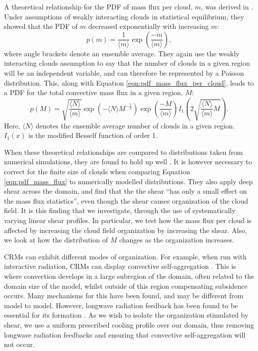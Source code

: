 \documentclass[11pt,a4paper]{article}
\newcommand\todo[1]{\textbf{TODO: #1}}
\begin{document}
A theoretical relationship for the PDF of mass flux per cloud, $m$, was derived in \cite{CC2006I}. Under assumptions of weakly interacting clouds in statistical equilibrium, they showed that the PDF of $m$ decreased exponentially with increasing $m$:
\begin{equation}
    p(m) = \frac{1}{\langle m \rangle} \exp \left(\frac{-m}{\langle m \rangle} \right),
    \label{eqn:pdf_mass_flux_per_cloud}
\end{equation}
where angle brackets denote an ensemble average. They again use the weakly interacting clouds assumption to say that the number of clouds in a given region will be an independent variable, and can therefore be represented by a Poisson distribution. This, along with Equation \ref{eqn:pdf_mass_flux_per_cloud}, leads to a PDF for the total convective mass flux in a given region, $M$:
\begin{equation}
    p(M) = \sqrt{\frac{\langle N \rangle}{\langle m \rangle}} \exp \left( -\langle N \rangle M^{-\frac{1}{2}} \right) \exp \left( \frac{-M}{\langle m \rangle} \right)  I_1\left(2 \sqrt{\frac{\langle N \rangle}{\langle m \rangle} M}\right).
    \label{eqn:pdf_mass_flux}
\end{equation}
Here, $\langle N \rangle$ denotes the ensemble average number of clouds in a given region. $I_1(x)$ is the modified Besself function of order 1.

When these theoretical relationships are compared to distributions taken from numerical simulations, they are found to hold up well \parencite{CC2006II}. It is however necessary to correct for the finite size of clouds when comparing Equation \ref{eqn:pdf_mass_flux} to numerically modelled distributions. They also apply deep shear across the domain, and find that the the shear ``has only a small effect on the mass flux statistics'', even though the shear causes organization of the cloud field. 
It is this finding that we investigate, through the use of systematically varying linear shear profiles. In particular, we test how the mass flux per cloud is affected by increasing the cloud field organization by increasing the shear. Also, we look at how the distribution of $M$ changes as the organization increases.

CRMs can exhibit different modes of organization. For example, when run with interactive radiation, CRMs can display convective self-aggregation \parencite{wing2017convective}. 
This is where convection develops in a large subregion of the domain, often related to the domain size of the model, whilst outside of this region compensating subsidence occurs. Many mechanisms for this have been found, and may be different from model to model. 
However, longwave radiation feedback has been found to be essential for its formation \parencite{wing2017convective}. As we wish to isolate the organization stimulated by shear, we use a uniform prescribed cooling profile over our domain, thus removing longwave radiation feedbacks and ensuring that convective self-aggregation will not occur.
\end{document}
